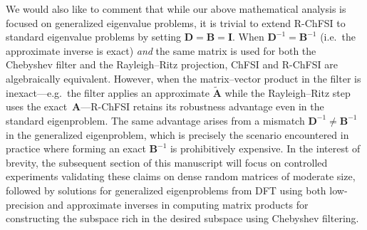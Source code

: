 \documentclass[preprint,3p,number,sort&compress]{elsarticle}
\newcommand{\bA}{\textbf{A}}
\newcommand{\bB}{\textbf{B}}
\newcommand{\bD}{\textbf{D}}
\newcommand{\bI}{\textbf{I}}
\begin{document}
We would also like to comment that while our above mathematical analysis is focused on generalized eigenvalue problems, it is trivial to extend R-ChFSI to standard eigenvalue problems by setting $\bD=\bB=\bI$. When $\bD^{-1}=\bB^{-1}$ (i.e.\ the approximate inverse is exact) \emph{and} the same matrix is used for both the Chebyshev filter and the Rayleigh--Ritz projection, ChFSI and R-ChFSI are algebraically equivalent. However, when the matrix--vector product in the filter is inexact---e.g.\ the filter applies an approximate $\tilde{\bA}$ while the Rayleigh--Ritz step uses the exact~$\bA$---R-ChFSI retains its robustness advantage even in the standard eigenproblem. The same advantage arises from a mismatch $\bD^{-1}\neq\bB^{-1}$ in the generalized eigenproblem, which is precisely the scenario encountered in practice where forming an exact $\bB^{-1}$ is prohibitively expensive. In the interest of brevity, the subsequent section of this manuscript will focus on controlled experiments validating these claims on dense random matrices of moderate size, followed by solutions for generalized eigenproblems from DFT using both low-precision and approximate inverses in computing matrix products for constructing the subspace rich in the desired subspace using Chebyshev filtering.
\end{document}
